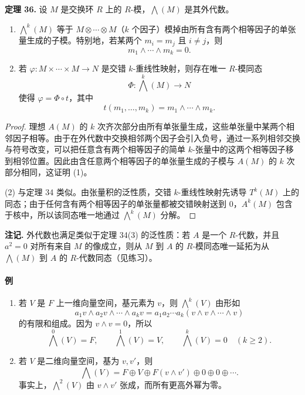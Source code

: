 \noindent\textbf{定理 36.} 设 $M$ 是交换环 $R$ 上的 $R$-模，$\bigwedge(M)$ 是其外代数。
\begin{enumerate}[label=(\arabic*)]
\item $\bigwedge^k(M)$ 等于 $M\otimes\cdots\otimes M$（$k$ 个因子）模掉由所有含有两个相等因子的单张量生成的子模。特别地，若某两个 $m_i=m_j$ 且 $i\neq j$，则
\[
m_1\wedge\cdots\wedge m_k=0.
\]
\item 若 $\varphi:M\times\cdots\times M\to N$ 是交错 $k$-重线性映射，则存在唯一 $R$-模同态
\[
\Phi:\bigwedge^k(M)\to N
\]
使得 $\varphi=\Phi\circ t$，其中
\[
t(m_1,
\ldots,m_k)=m_1\wedge\cdots\wedge m_k.
\]
\end{enumerate}

\begin{proof}
理想 $A(M)$ 的 $k$ 次齐次部分由所有单张量生成，这些单张量中某两个相邻因子相等。由于在外代数中交换相邻两个因子会引入负号，通过一系列相邻交换与符号改变，可以把任意含有两个相等因子的简单 $k$-张量中的这两个相等因子移到相邻位置。因此由含任意两个相等因子的单张量生成的子模与 $A(M)$ 的 $k$ 次部分相同，这证明 (1)。

(2) 与定理 34 类似。由张量积的泛性质，交错 $k$-重线性映射先诱导 $T^k(M)$ 上的同态；由于任何含有两个相等因子的单张量都被交错映射送到 $0$，$A^k(M)$ 包含于核中，所以该同态唯一地通过 $\bigwedge^k(M)$ 分解。
\end{proof}

\noindent\textbf{注记.} 外代数也满足类似于定理 34(3) 的泛性质：若 $A$ 是一个 $R$-代数，并且 $a^2=0$ 对所有来自 $M$ 的像成立，则从 $M$ 到 $A$ 的 $R$-模同态唯一延拓为从 $\bigwedge(M)$ 到 $A$ 的 $R$-代数同态（见练习）。

\paragraph{例}
\begin{enumerate}[label=(\arabic*)]
\item 若 $V$ 是 $F$ 上一维向量空间，基元素为 $v$，则 $\bigwedge^k(V)$ 由形如
\[
a_1v\wedge a_2v\wedge\cdots\wedge a_kv=a_1a_2\cdots a_k(v\wedge v\wedge\cdots\wedge v)
\]
的有限和组成。因为 $v\wedge v=0$，所以
\[
\bigwedge^0(V)=F,
\qquad
\bigwedge^1(V)=V,
\qquad
\bigwedge^k(V)=0\quad(k\geq2).
\]
\item 若 $V$ 是二维向量空间，基为 $v,v'$，则
\[
\bigwedge(V)=F\oplus V\oplus F(v\wedge v')\oplus0\oplus0\oplus\cdots.
\]
事实上，$\bigwedge^2(V)$ 由 $v\wedge v'$ 张成，而所有更高外幂为零。
\end{enumerate}

